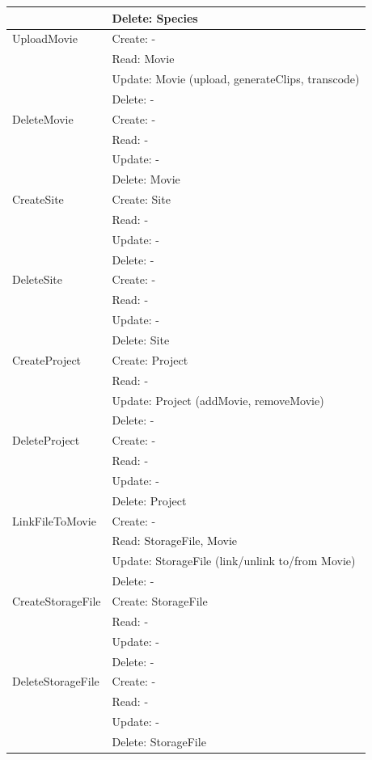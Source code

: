 \begin{longtable}{|l|l|}
                  & Delete: Species \\
    \hline
    UploadMovie & Create: - \\
                & Read: Movie \\
                & Update: Movie (upload, generateClips, transcode) \\
                & Delete: - \\
    \hline
    DeleteMovie & Create: - \\
                & Read: - \\
                & Update: - \\
                & Delete: Movie \\
    \hline
    CreateSite & Create: Site \\
               & Read: - \\
               & Update: - \\
               & Delete: - \\
    \hline
    DeleteSite & Create: - \\
               & Read: - \\
               & Update: - \\
               & Delete: Site \\
    \hline
    CreateProject & Create: Project \\
                 & Read: - \\
                 & Update: Project (addMovie, removeMovie) \\
                 & Delete: - \\
    \hline
    DeleteProject & Create: - \\
                 & Read: - \\
                 & Update: - \\
                 & Delete: Project \\
    \hline
    LinkFileToMovie & Create: - \\
                   & Read: StorageFile, Movie \\
                   & Update: StorageFile (link/unlink to/from Movie) \\
                   & Delete: - \\
    \hline
    CreateStorageFile & Create: StorageFile \\
                     & Read: - \\
                     & Update: - \\
                     & Delete: - \\
    \hline
    DeleteStorageFile & Create: - \\
                     & Read: - \\
                     & Update: - \\
                     & Delete: StorageFile \\
    \hline
    \end{longtable}

